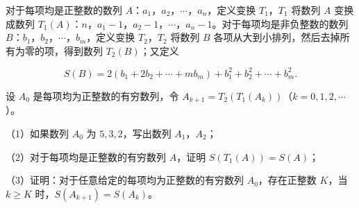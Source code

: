 \begin{question}
对于每项均是正整数的数列 $A$：$a_1$，$a_2$，$\cdots$，$a_n$，定义变换 $T_1$，$T_1$ 将数列 $A$ 变换成数列 $T_1(A)$：$n$，$a_1-1$，$a_2-1$，$\cdots$，$a_n-1$。对于每项均是非负整数的数列 $B$：$b_1$，$b_2$，$\cdots$，$b_m$，定义变换 $T_2$，$T_2$ 将数列 $B$ 各项从大到小排列，然后去掉所有为零的项，得到数列 $T_2(B)$；又定义

\nopagebreak[4]
\[S(B)=2(b_1+2b_2+\cdots+mb_m)+b_1^2+b_2^2+\cdots+b_m^2.\]

设 $A_0$ 是每项均为正整数的有穷数列，令 $A_{k+1}=T_2(T_1(A_k))$（$k=0,1,2,\cdots$）。

（1）如果数列 $A_0$ 为 $5,3,2$，写出数列 $A_1$，$A_2$；

（2）对于每项均是正整数的有穷数列 $A$，证明 $S(T_1(A))=S(A)$；

（3）证明：对于任意给定的每项均为正整数的有穷数列 $A_0$，存在正整数 $K$，当 $k\geqslant K$ 时，$S(A_{k+1})=S(A_k)$。

\end{question}